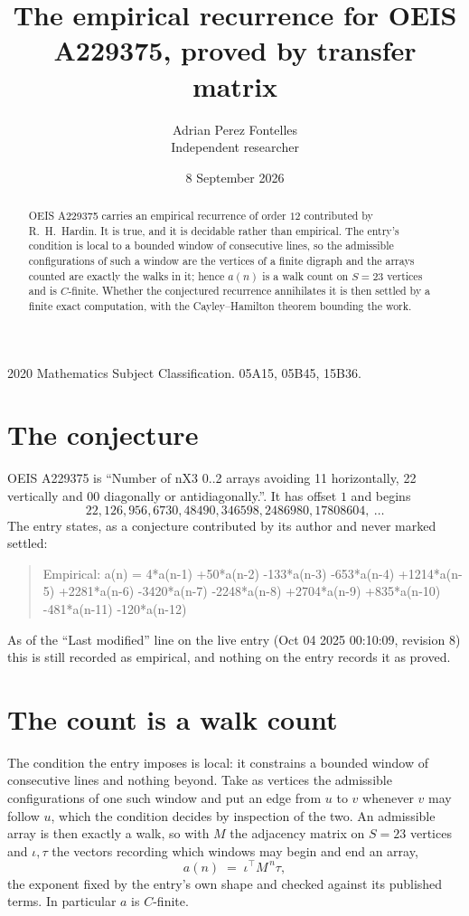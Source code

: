 \documentclass[11pt,a4paper]{article}
\title{The empirical recurrence for OEIS A229375, proved by transfer matrix}
\author{Adrian Perez Fontelles\\ \small Independent researcher}
\date{8 September 2026}
\theoremstyle{plain}
\theoremstyle{definition}
\begin{document}
\maketitle

\begin{abstract}
OEIS A229375 carries an empirical recurrence of order $12$ contributed by R.~H.~Hardin. It is
true, and it is decidable rather than empirical. The entry's condition is local to a bounded window of consecutive lines, so
the admissible configurations of such a window are the vertices of a finite digraph and the
arrays counted are exactly the walks in it; hence $a(n)$ is a walk count on $S=23$ vertices
and is $C$-finite. Whether the conjectured recurrence annihilates it is then settled by a
finite exact computation, with the Cayley--Hamilton theorem bounding the work.
\end{abstract}

\noindent\small 2020 Mathematics Subject Classification. 05A15, 05B45, 15B36.\normalsize

\section{The conjecture}

OEIS A229375 is ``Number of nX3 0..2 arrays avoiding 11 horizontally, 22 vertically and 00 diagonally or antidiagonally.''. It has offset $1$ and begins
\[
22, 126, 956, 6730, 48490, 346598, 2486980, 17808604,\ \dots
\]
The entry states, as a conjecture contributed by its author and never marked settled:
\begin{quote}
Empirical: a(n) = 4*a(n-1) +50*a(n-2) -133*a(n-3) -653*a(n-4) +1214*a(n-5) +2281*a(n-6) -3420*a(n-7) -2248*a(n-8) +2704*a(n-9) +835*a(n-10) -481*a(n-11) -120*a(n-12)
\end{quote}
As of the ``Last modified'' line on the live entry (Oct 04 2025 00:10:09, revision 8) this is still
recorded as empirical, and nothing on the entry records it as proved.

\section{The count is a walk count}

The condition the entry imposes is local: it constrains a bounded window of consecutive lines and nothing beyond. Take as
vertices the admissible configurations of one such window and put an edge from $u$ to $v$
whenever $v$ may follow $u$, which the condition decides by inspection of the two. An
admissible array is then exactly a walk, so with $M$ the adjacency matrix on $S=23$ vertices
and $\iota,\tau$ the vectors recording which windows may begin and end an array,
\[
a(n)\;=\;\iota^{\!\top}M^{\,n}\tau ,
\]
the exponent fixed by the entry's own shape and checked against its published terms. In
particular $a$ is $C$-finite.
\end{document}
